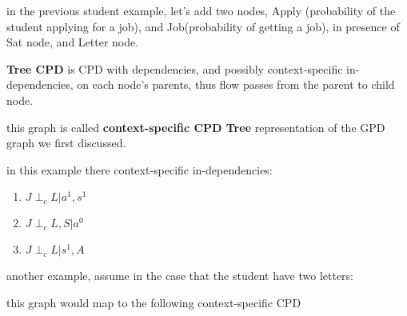 \documentclass[4apaper,12pt]{book}
\begin{document}
\begin{description}
\begin{description}

    \item in the previous student example, let's add two nodes, Apply (probability of the student applying for a job), and Job(probability of getting a job), in presence of Sat node, and Letter node.
    \item \textbf{Tree CPD} is CPD with dependencies, and possibly context-specific in-dependencies, on each node's parents, thus flow passes from the parent to child node.
      \item this graph is called \textbf{context-specific CPD Tree} representation of the GPD graph we first discussed.
    \item in this example there  context-specific in-dependencies: \begin{enumerate}
    \item $J\perp_cL|a^1,s^1$
    \item $J\perp_cL,S|a^0$
    \item $J\perp_cL|s^1,A$
    \end{enumerate}
    \item another example, assume in the case that the student have two letters:
    \item  {}
    \item this graph would map to the following context-specific CPD
    \item  \begin{tikzpicture}[node distance={30mm}, thick, main/.style = {draw, circle}, val/.style = {draw, rectangle}]


\end{tikzpicture}
\end{description}
\end{description}
\end{document}
